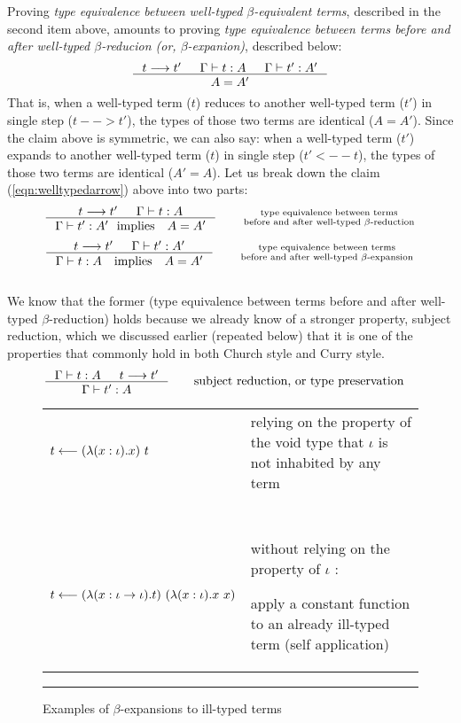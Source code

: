 Proving \emph{type equivalence between well-typed $\beta$-equivalent terms},
described in the second item above, amounts to proving \emph{type equivalence
between terms before and after well-typed $\beta$-reducion
(or, $\beta$-expanion)},
described below:
\begin{align}
\inference{t --> t' & \Gamma |- t : A & \Gamma |- t' : A'}{A = A'}
	\label{eqn:welltypedarrow}
\end{align}
That is, when a well-typed term ($t$) reduces to
another well-typed term ($t'$) in single step ($t --> t'$),
the types of those two terms are identical ($A=A'$).
Since the claim above is symmetric, we can also say: when a well-typed term
($t'$) expands to another well-typed term ($t$) in single step ($t' <-- t$),
the types of those two terms are identical ($A'=A$).
Let us break down the claim (\ref{eqn:welltypedarrow}) above into two parts:
\[
\inference{t --> t' & \Gamma |- t : A}
          {\Gamma |- t' : A' ~~\text{implies}\quad A = A'} \qquad
	\begin{smallmatrix}
		\text{type equivalence between terms} \\
  		\text{before and after well-typed $\beta$-reduction}
	\end{smallmatrix}
\]
\[
\inference{t --> t' & \Gamma |- t' : A'}
          {\Gamma |- t : A \quad\text{implies}\quad A = A'} \qquad
	\begin{smallmatrix}
		\text{type equivalence between terms} \\
  		\text{before and after well-typed $\beta$-expansion}
	\end{smallmatrix}
\]~\vspace*{-3em}\\

We know that the former (type equivalence between terms before and after
well-typed $\beta$-reduction) holds because we already know of
a stronger property, subject reduction, which we discussed earlier
(repeated below) that it is one of the properties that commonly hold
in both Church style and Curry style.
\begin{align*}
\inference{\Gamma |- t : A  & t --> t'}{\Gamma |- t' : A}
 &\qquad \text{subject reduction, or type preservation}
\end{align*}

\begin{figure}
\begin{singlespace}
\begin{tabular}{lp{7cm}}
$t <-- (\lambda(x:\iota).x)~t$ &
relying on the property of the void type
that $\iota$ is not inhabited by any term
\\ ~ \\
$t <-- (\lambda(x:\iota -> \iota).t)~(\lambda(x:\iota).x~x)$ &
without relying on the property of $\iota$ : \par
apply a constant function to an already ill-typed term (self application)
\end{tabular}
\end{singlespace}
\caption{Examples of $\beta$-expansions to ill-typed terms}
\label{ill-typed_expand}
\hrule
\end{figure}

